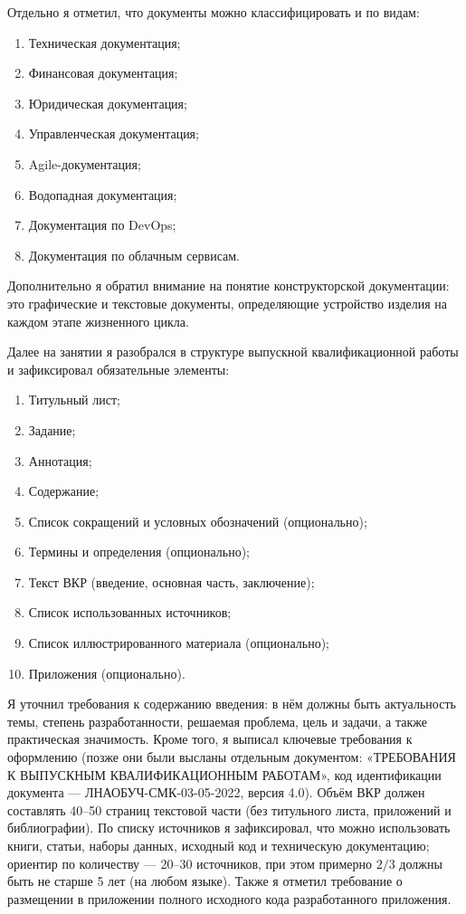 Отдельно я отметил, что документы можно классифицировать и по видам:
\begin{enumerate}[label=\arabic*)]
  \item Техническая документация;
  \item Финансовая документация;
  \item Юридическая документация;
  \item Управленческая документация;
  \item Agile-документация;
  \item Водопадная документация;
  \item Документация по DevOps;
  \item Документация по облачным сервисам.
\end{enumerate}

Дополнительно я обратил внимание на понятие конструкторской документации: 
это графические и текстовые документы, определяющие устройство изделия на каждом этапе жизненного цикла.

Далее на занятии я разобрался в структуре выпускной квалификационной работы и зафиксировал обязательные элементы:
\begin{enumerate}[label=\arabic*)]
  \item Титульный лист;
  \item Задание;
  \item Аннотация;
  \item Содержание;
  \item Список сокращений и условных обозначений (опционально);
  \item Термины и определения (опционально);
  \item Текст ВКР (введение, основная часть, заключение);
  \item Список использованных источников;
  \item Список иллюстрированного материала (опционально);
  \item Приложения (опционально).
\end{enumerate}
Я уточнил требования к содержанию введения: в нём должны быть актуальность темы, степень разработанности, решаемая проблема, цель и задачи, 
а также практическая значимость.
Кроме того, я выписал ключевые требования к оформлению (позже они были высланы отдельным документом: «ТРЕБОВАНИЯ К ВЫПУСКНЫМ КВАЛИФИКАЦИОННЫМ РАБОТАМ», код идентификации документа — ЛНАОБУЧ-СМК-03-05-2022, версия 4.0). 
Объём ВКР должен составлять 40--50 страниц текстовой части (без титульного листа, приложений и библиографии).
По списку источников я зафиксировал, что можно использовать книги, статьи, наборы данных, исходный код и техническую документацию; 
ориентир по количеству — 20--30 источников, при этом примерно \(2/3\) должны быть не старше 5 лет (на любом языке).
Также я отметил требование о размещении в приложении полного исходного кода разработанного приложения.

